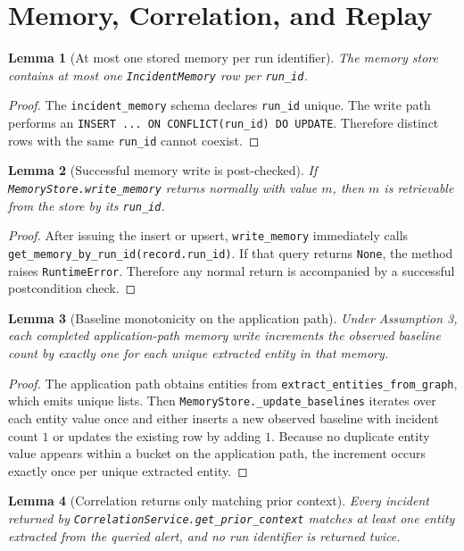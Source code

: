 \documentclass[11pt]{article}
\newtheorem{lemma}{Lemma}
\theoremstyle{definition}
\begin{document}
\section{Memory, Correlation, and Replay}
\begin{lemma}[At most one stored memory per run identifier]
The memory store contains at most one \texttt{IncidentMemory} row per \texttt{run\_id}.
\end{lemma}

\begin{proof}
The \texttt{incident\_memory} schema declares \texttt{run\_id} unique. The write path performs an
\texttt{INSERT ... ON CONFLICT(run\_id) DO UPDATE}. Therefore distinct rows with the same
\texttt{run\_id} cannot coexist.
\end{proof}

\begin{lemma}[Successful memory write is post-checked]
If \texttt{MemoryStore.write\_memory} returns normally with value \(m\), then \(m\) is retrievable
from the store by its \texttt{run\_id}.
\end{lemma}

\begin{proof}
After issuing the insert or upsert, \texttt{write\_memory} immediately calls
\texttt{get\_memory\_by\_run\_id(record.run\_id)}. If that query returns \texttt{None}, the method
raises \texttt{RuntimeError}. Therefore any normal return is accompanied by a successful
postcondition check.
\end{proof}

\begin{lemma}[Baseline monotonicity on the application path]
Under Assumption 3, each completed application-path memory write increments the observed
baseline count by exactly one for each unique extracted entity in that memory.
\end{lemma}

\begin{proof}
The application path obtains entities from \texttt{extract\_entities\_from\_graph}, which emits
unique lists. Then \texttt{MemoryStore.\_update\_baselines} iterates over each entity value once
and either inserts a new observed baseline with incident count \(1\) or updates the existing row
by adding \(1\). Because no duplicate entity value appears within a bucket on the application
path, the increment occurs exactly once per unique extracted entity.
\end{proof}

\begin{lemma}[Correlation returns only matching prior context]
Every incident returned by \texttt{CorrelationService.get\_prior\_context} matches at least one
entity extracted from the queried alert, and no run identifier is returned twice.
\end{lemma}
\end{document}
